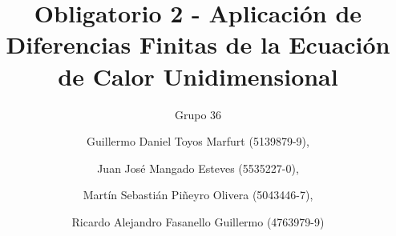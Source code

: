 \documentclass{endm}
\begin{document}
\begin{verbatim}
\end{verbatim}
\vspace{0.6 cm}
\begin{frontmatter}

\title{Obligatorio 2 - Aplicaci\'on de Diferencias Finitas de la Ecuaci\'on de Calor
Unidimensional}

\subtitle{Grupo 36}

\author{Guillermo Daniel Toyos Marfurt (5139879-9),}
\author{Juan Jos\'e Mangado Esteves (5535227-0),}
\author{Martín Sebastián Piñeyro Olivera (5043446-7),}
\author{Ricardo Alejandro Fasanello Guillermo (4763979-9)}


\end{frontmatter}
\end{document}
